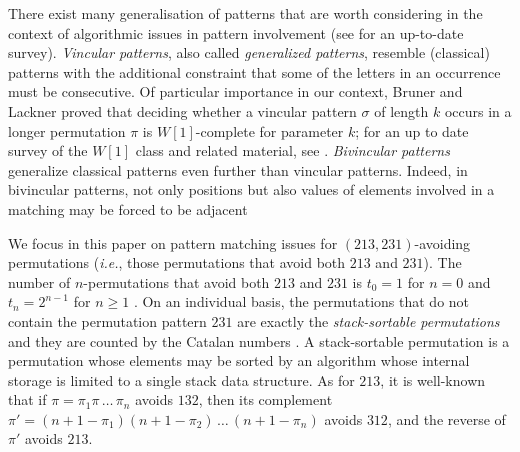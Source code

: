\documentclass[a4paper]{llncs}
\newcounter{num}
\begin{document}
	There exist many generalisation of patterns that are worth considering
	in the context of algorithmic issues in pattern involvement
	(see \cite{Kitaev:book:2011} for an up-to-date survey).
	\emph{Vincular patterns}, also called
	\emph{generalized patterns},
	resemble (classical) patterns with the additional constraint that some of the letters in
	an occurrence must be consecutive.
	Of particular importance in our context,
	Bruner and Lackner \cite{Bruner:Lackner:SWAT:2012}
	proved that deciding whether a vincular pattern
	$\sigma$ of length $k$ occurs in a longer permutation
	$\pi$ is $W[1]$-complete for
	parameter $k$;
	for an up to date survey of the $W[1]$ class and related material, see
	\cite{Downey:Fellows:2013}.
	\emph{Bivincular patterns} generalize classical patterns even further
	than vincular
	patterns. Indeed, in bivincular patterns,
	not only positions but also values
	of elements involved in a matching may be forced to be adjacent

	We focus in this paper on pattern matching issues for
	$(213,231)$-avoiding permutations
    (\emph{i.e.}, those permutations that avoid both $213$ and $231$).
	The number of $n$-permutations that avoid both
	$213$ and $231$ is
	$t_0 = 1$ for $n = 0$ and
	$t_n =2^{n-1}$ for $n\geq 1$ \cite{Simion:Schmidt:EJC:1985}.
	On an individual basis,
	the permutations that do not contain the permutation pattern $231$
	are exactly the \emph{stack-sortable permutations} and they are counted by
	the Catalan numbers \cite{Knuth:1997:ACP:260999}.
	A stack-sortable permutation is a permutation whose elements may be sorted by
	an algorithm whose internal storage is limited to a single stack data structure.
	As for $213$, it is well-known that
 	if $\pi = \pi_1\pi\,\ldots\,\pi_n$ avoids $132$, then its complement
 	$\pi' = (n+1-\pi_1)(n+1-\pi_2)\,\ldots\,(n+1-\pi_n)$ avoids $312$, and
 	the reverse of $\pi'$ avoids $213$.
\end{document}
